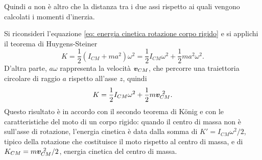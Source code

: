 \begin{obs}
    Quindi $a$ non è altro che la distanza tra i due assi rispetto ai quali vengono calcolati i momenti d'inerzia.
\end{obs}
Si riconsideri l'equazione \eqref{eq: energia cinetica rotazione corpo rigido} e si applichi il teorema di Huygens-Steiner
\begin{equation}
    K=\frac{1}{2}(I_{CM}+ma^2)\omega^2=\frac{1}{2}I_{CM}\omega^2+\frac{1}{2}ma^2\omega^2.
\end{equation}
D'altra parte, $a\omega$ rappresenta la velocità $\bm{v}_{CM}$, che percorre una traiettoria circolare di raggio $a$ rispetto all'asse $z$, quindi 
\begin{equation}
    K=\frac{1}{2}I_{CM}\omega^2+\frac{1}{2}m\vcm^{\ 2}.
\end{equation}
Questo risultato è in accordo con il secondo teorema di K\"onig e con le caratteristiche del moto di un corpo rigido: quando il centro di massa non è sull'asse di rotazione, l'energia cinetica è data dalla somma di $K'=I_{CM}\omega^2/2$, tipico della rotazione che costituisce il moto rispetto al centro di massa, e di $K_{CM}=m\bm{v}_{CM}^{\ 2}/2$, energia cinetica del centro di massa. 

